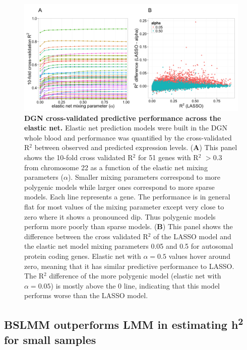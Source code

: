 \documentclass[10pt,letterpaper]{article}
\begin{document}
\begin{figure}[H]
\includegraphics[width=12cm]{Figures/Fig-DGN-EN.png}
\caption{{\bf DGN cross-validated predictive performance across the elastic net.} 
Elastic net prediction models were built in the DGN whole blood and performance was quantified by the cross-validated R$^2$ between observed and predicted expression levels. (\textbf{A}) This panel shows the 10-fold cross validated R$^2$ for 51 genes with R$^2$ $>0.3$ from chromosome 22 as a function of the elastic net mixing parameters (\(\alpha\)). Smaller mixing parameters correspond to more polygenic models while larger ones correspond to more sparse models. Each line represents a gene. The performance is in general flat for most values of the mixing parameter except very close to zero where it shows a pronounced dip. Thus polygenic models perform more poorly than sparse models. (\textbf{B}) This panel shows the difference between the cross validated R$^2$ of the LASSO model and the elastic net model mixing parameters 0.05 and 0.5 for autosomal protein coding genes. Elastic net with $\alpha=0.5$ values hover around zero, meaning that it has similar predictive performance to LASSO. The R$^2$ difference of the more polygenic model (elastic net with $\alpha=0.05$) is mostly above the 0 line, indicating that this model performs worse than the LASSO model.
}
\label{fig-dgn-en}
\end{figure}


\subsection*{BSLMM outperforms LMM in estimating h\textsuperscript{2}  for small samples}
\end{document}
